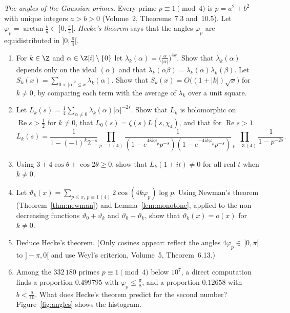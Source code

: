 \begin{exercise}[$\star\star\star$]\label{pb:hecke}
\emph{The angles of the Gaussian primes.} Every prime $p\equiv1\pmod4$ is $p=a^2+b^2$ with unique integers $a>b>0$ (Volume~2, Theorems~7.3 and~10.5). Let
$\varphi_p=\arctan\frac ba\in\,]0,\frac\pi4[$. \emph{Hecke's theorem} says that the angles $\varphi_p$ are equidistributed in $]0,\frac\pi4[$.
\begin{enumerate}[label=(\alph*)]
\item For $k\in\Z$ and $\alpha\in\Z[i]\setminus\{0\}$ let $\lambda_k(\alpha)=\bigl(\frac\alpha{|\alpha|}\bigr)^{4k}$. Show that $\lambda_k(\alpha)$ depends only on the ideal
$(\alpha)$ and that $\lambda_k(\alpha\beta)=\lambda_k(\alpha)\lambda_k(\beta)$. Let $S_k(x)=\sum_{0<|\alpha|^2\le x}\lambda_k(\alpha)$. Show that $S_k(x)=O\bigl((1+|k|)\sqrt x\bigr)$
for $k\ne0$, by comparing each term with the average of $\lambda_k$ over a unit square.
\item Let $L_k(s)=\frac14\sum_{\alpha\ne0}\lambda_k(\alpha)|\alpha|^{-2s}$. Show that $L_k$ is holomorphic on $\operatorname{Re}s>\frac12$ for $k\ne0$, that
$L_0(s)=\zeta(s)L(s,\chi_4)$, and that for $\operatorname{Re}s>1$
\[
L_k(s)=\frac1{1-(-1)^k2^{-s}}\prod_{p\equiv1\,(4)}\frac1{(1-e^{4ik\varphi_p}p^{-s})(1-e^{-4ik\varphi_p}p^{-s})}\prod_{p\equiv3\,(4)}\frac1{1-p^{-2s}}.
\]
\item Using $3+4\cos\theta+\cos2\theta\ge0$, show that $L_k(1+it)\ne0$ for all real $t$ when $k\ne0$.
\item Let $\vartheta_k(x)=\sum_{p\le x,\ p\equiv1\,(4)}2\cos(4k\varphi_p)\log p$. Using Newman's theorem (Theorem~\ref{thm:newman}) and Lemma~\ref{lem:monotone}, applied to the
non-decreasing functions $\vartheta_0+\vartheta_k$ and $\vartheta_0-\vartheta_k$, show that $\vartheta_k(x)=o(x)$ for $k\ne0$.
\item Deduce Hecke's theorem. (Only cosines appear: reflect the angles $4\varphi_p\in\,]0,\pi[$ to $]-\pi,0[$ and use Weyl's criterion, Volume~5, Theorem~6.13.)
\item Among the $332\,180$ primes $p\equiv1\pmod4$ below $10^7$, a direct computation finds a proportion $0.499795$ with $\varphi_p\le\frac\pi8$, and a proportion $0.12658$
with $b<\frac a{10}$. What does Hecke's theorem predict for the second number? Figure~\ref{fig:angles} shows the histogram.
\end{enumerate}
\end{exercise}

